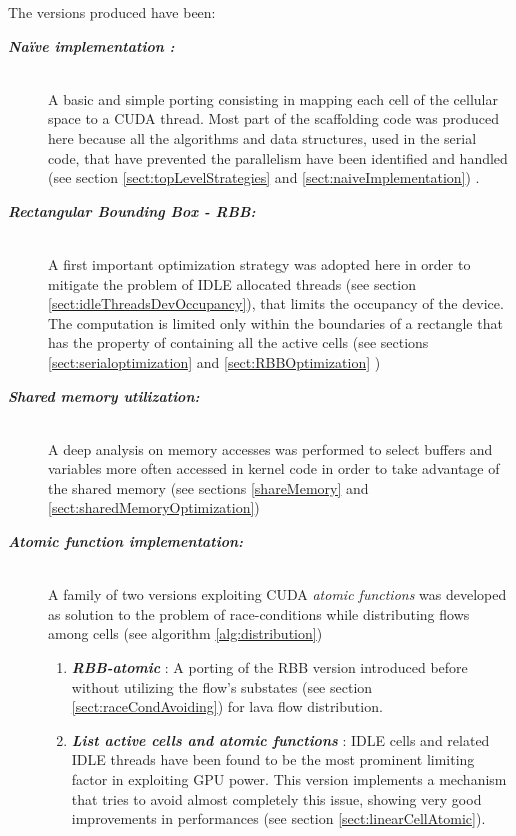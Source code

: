 The versions produced have been:
\begin{description}
\item [\textbf{\textit{Na\"{i}ve implementation :}}] \hfill \\ A basic and simple porting
consisting in mapping each cell of the cellular space to a CUDA
thread. Most part of the scaffolding code was produced here because all the
algorithms and data structures, used in the serial code, that have prevented the parallelism
have been identified and handled (see section \ref{sect:topLevelStrategies} and \ref{sect:naiveImplementation}) .

\item [\textbf{\textit{Rectangular Bounding Box - RBB:}}] \hfill \\ A first
important optimization strategy was adopted here in order to mitigate the
problem of IDLE allocated threads (see section
\ref{sect:idleThreadsDevOccupancy}), that limits the occupancy of the device.
The computation is limited only within the boundaries of a rectangle that has
the property of containing all the active cells (see sections
\ref{sect:serialoptimization} and \ref{sect:RBBOptimization} ) \item
[\textbf{\textit{Shared memory utilization:}}] \hfill \\
A deep analysis on memory accesses was performed to select buffers and
variables more often accessed in kernel code in order to take advantage of the
shared memory (see sections \ref{shareMemory} and
\ref{sect:sharedMemoryOptimization}) \item [\textbf{\textit{Atomic function
implementation:}}] \hfill \\
A family of two versions exploiting CUDA \textit{atomic functions} was developed
as solution to the problem of race-conditions while distributing flows among
cells (see algorithm \ref{alg:distribution})
\begin{enumerate}
  \item \textbf{\textit{RBB-atomic}} : A porting of the RBB version
  introduced before without utilizing the flow's substates (see section \ref{sect:raceCondAvoiding}) for lava flow
  distribution.
  \item \textbf{\textit{List active cells and atomic functions}} : IDLE cells
  and related IDLE threads have been found to be the most prominent limiting
  factor in exploiting GPU power. This version implements a mechanism that tries
  to avoid almost completely this issue, showing very good improvements in
  performances (see section \ref{sect:linearCellAtomic}).
\end{enumerate}
\end{description}


